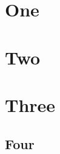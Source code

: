 \documentclass{article}
\begin{document}
\tableofcontents

\section{One}
\section{Two}
\section{Three}
\subsection{Four}
\end{document}
